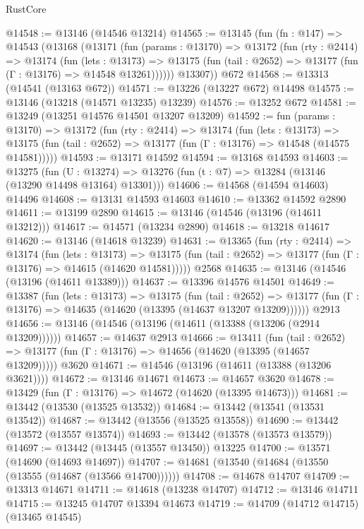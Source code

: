 \begin{lexlean}{RustCore}
\begin{coremodule}
@14548 := @13146 (@14546 @13214)
@14565 := @13145
    (fun (fn : @147) =>
    @14543
      (@13168
        (@13171
          (fun (params : @13170) =>
          @13172
            (fun (rty : @2414) =>
            @13174
              (fun (lets : @13173) =>
              @13175 (fun (tail : @2652) => @13177 (fun (Γ : @13176) => @14548 @13261))))))
        @13307))
    @672
@14568 := @13313 (@14541 (@13163 @672))
@14571 := @13226 (@13227 @672) @14498
@14575 := @13146 (@13218 (@14571 @13235) @13239)
@14576 := @13252 @672
@14581 := @13249 (@13251 @14576 @14501 @13207 @13209)
@14592 := fun (params : @13170) =>
  @13172
    (fun (rty : @2414) =>
    @13174
      (fun (lets : @13173) =>
      @13175 (fun (tail : @2652) => @13177 (fun (Γ : @13176) => @14548 (@14575 @14581)))))
@14593 := @13171 @14592
@14594 := @13168 @14593
@14603 := @13275
    (fun (U : @13274) => @13276 (fun (t : @7) => @13284 (@13146 (@13290 @14498 @13164) @13301)))
@14606 := @14568 (@14594 @14603) @14496
@14608 := @13131 @14593 @14603
@14610 := @13362 @14592 @2890
@14611 := @13199 @2890
@14615 := @13146 (@14546 (@13196 (@14611 @13212)))
@14617 := @14571 (@13234 @2890)
@14618 := @13218 @14617
@14620 := @13146 (@14618 @13239)
@14631 := @13365
    (fun (rty : @2414) =>
    @13174
      (fun (lets : @13173) =>
      @13175 (fun (tail : @2652) => @13177 (fun (Γ : @13176) => @14615 (@14620 @14581)))))
    @2568
@14635 := @13146 (@14546 (@13196 (@14611 @13389)))
@14637 := @13396 @14576 @14501
@14649 := @13387
    (fun (lets : @13173) =>
    @13175
      (fun (tail : @2652) =>
      @13177 (fun (Γ : @13176) => @14635 (@14620 (@13395 (@14637 @13207 @13209))))))
    @2913
@14656 := @13146 (@14546 (@13196 (@14611 (@13388 (@13206 (@2914 @13209))))))
@14657 := @14637 @2913
@14666 := @13411
    (fun (tail : @2652) => @13177 (fun (Γ : @13176) => @14656 (@14620 (@13395 (@14657 @13209)))))
    @3620
@14671 := @14546 (@13196 (@14611 (@13388 (@13206 @3621))))
@14672 := @13146 @14671
@14673 := @14657 @3620
@14678 := @13429 (fun (Γ : @13176) => @14672 (@14620 (@13395 @14673)))
@14681 := @13442 (@13530 (@13525 @13532))
@14684 := @13442 (@13541 (@13531 @13542))
@14687 := @13442 (@13556 (@13525 @13558))
@14690 := @13442 (@13572 (@13557 @13574))
@14693 := @13442 (@13578 (@13573 @13579))
@14697 := @13442 (@13445 (@13557 @13450)) @13225
@14700 := @13571 (@14690 (@14693 @14697))
@14707 := @14681 (@13540 (@14684 (@13550 (@13555 (@14687 (@13566 @14700))))))
@14708 := @14678 @14707
@14709 := @13313 @14671
@14711 := @14618 (@13238 @14707)
@14712 := @13146 @14711
@14715 := @13245 @14707 @13394 @14673
@14719 := @14709 (@14712 @14715) (@13465 @14545)

\end{coremodule}
\end{lexlean}
